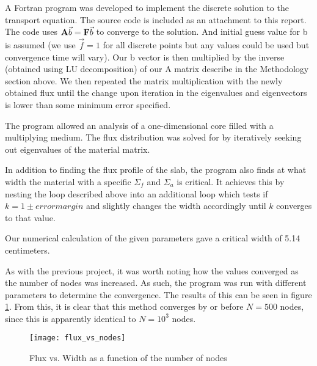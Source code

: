 \documentclass[../main.tex]{subfiles}
\begin{document}
A Fortran program was developed to implement the discrete solution to the transport equation. The source code is included as an attachment to this report. The code uses $\mathbf{A} \vec{b} = \mathbf{F} \vec{b}$ to converge to the solution. And initial guess value for b is assumed (we use $\vec{f}=1$ for all discrete points but any values could be used but convergence time will vary). Our b vector is then multiplied by the inverse (obtained using LU decomposition) of our A matrix describe in the Methodology section above. We then repeated the matrix multiplication with the newly obtained flux until the change upon iteration in the eigenvalues and eigenvectors is lower than some minimum error specified.

The program allowed an analysis of a one-dimensional core filled with a multiplying medium. The flux distribution was solved for by iteratively seeking out eigenvalues of the material matrix. 

In addition to finding the flux profile of the slab, the program also finds at what width the material with a specific $\Sigma_f$ and $\Sigma_a$ is critical. It achieves this by nesting the loop described above into an additional loop which tests if $k = 1 \pm error margin$  and slightly changes the width accordingly until $k$ converges to that value. 

Our numerical calculation of the given parameters gave a critical width of 5.14 centimeters.

As with the previous project, it was worth noting how the values converged as the number of nodes was increased. As such, the program was run with different parameters to determine the convergence. The results of this can be seen in figure \ref{fig:flux_vs_nodes}. From this, it is clear that this method converges by or before $N=500$ nodes, since this is apparently identical to $N=10^3$ nodes.

\begin{figure}
\centering
\texttt{[image: flux\_vs\_nodes]}
\caption{Flux vs. Width as a function of the number of nodes}
\label{fig:flux_vs_nodes}
\end{figure}
\end{document}

